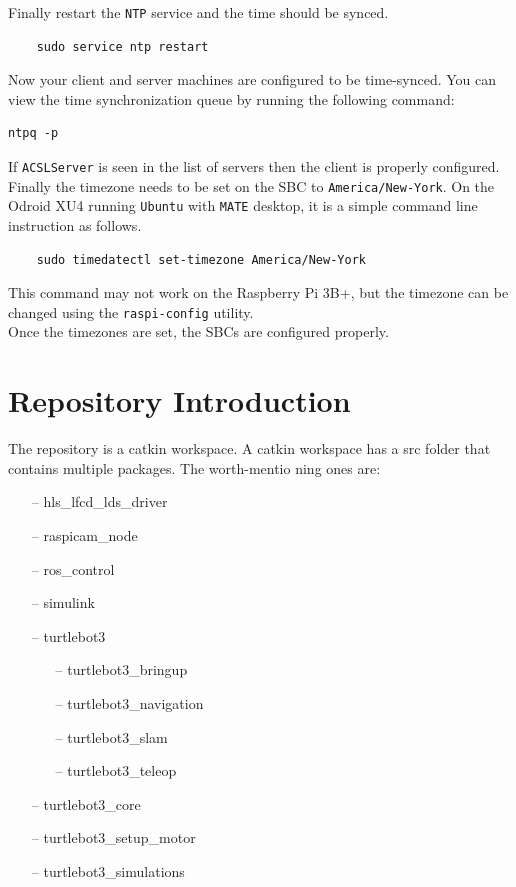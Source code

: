 \documentclass[12]{article}
\begin{document}
Finally restart the \texttt{NTP} service and the time should be synced.
\begin{lstlisting}
	sudo service ntp restart
\end{lstlisting}
Now your client and server machines are configured to be time-synced. You can view the time synchronization queue by running the following command:
\begin{lstlisting}
ntpq -p
\end{lstlisting}
If \texttt{ACSLServer} is seen in the list of servers then the client is properly configured.\\
Finally the timezone needs to be set on the SBC to \texttt{America/New-York}. On the Odroid XU4 running \texttt{Ubuntu} with \texttt{MATE} desktop, it is a simple command line instruction as follows.
\begin{lstlisting}
	sudo timedatectl set-timezone America/New-York
\end{lstlisting}
This command may not work on the Raspberry Pi 3B+, but the timezone can be changed using the \texttt{raspi-config} utility.\\
Once the timezones are set, the SBCs are configured properly.
\newpage
\section{Repository Introduction}
The repository is a catkin workspace. A catkin workspace has a src folder that contains multiple packages. The worth-mentio ning ones are:
\begin{itemize}
	\item[--] hls\_lfcd\_lds\_driver
    \item[--] raspicam\_node
    \item[--] ros\_control
    \item[--] simulink
    \item[--] turtlebot3
    \begin{itemize}
        \item[--] turtlebot3\_bringup
        \item[--] turtlebot3\_navigation
        \item[--] turtlebot3\_slam
        \item[--] turtlebot3\_teleop
    \end {itemize}
    \item[--] turtlebot3\_core
    \item[--] turtlebot3\_setup\_motor
    \item[--] turtlebot3\_simulations
\end{itemize} 
\end{document}
